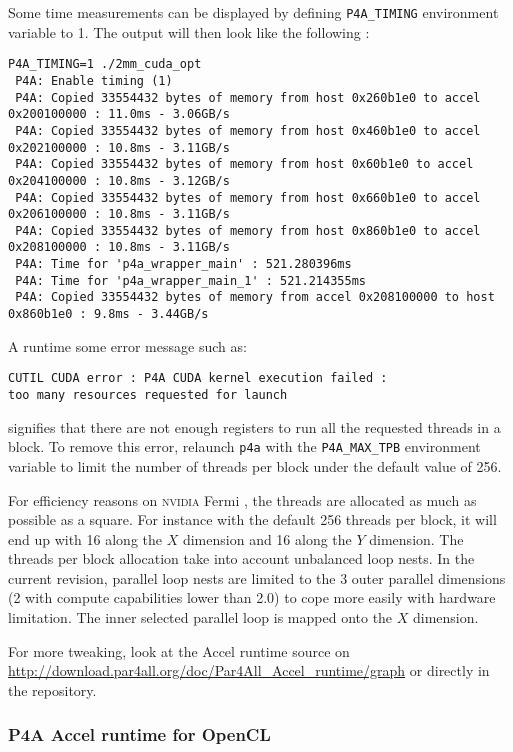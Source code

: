 \documentclass[a4paper]{article}
\begin{document}
Some time measurements can be displayed by defining
\verb|P4A_TIMING| environment variable to 1. The output will then look like the
following : {\scriptsize
\begin{verbatim}
P4A_TIMING=1 ./2mm_cuda_opt
 P4A: Enable timing (1)
 P4A: Copied 33554432 bytes of memory from host 0x260b1e0 to accel 0x200100000 : 11.0ms - 3.06GB/s
 P4A: Copied 33554432 bytes of memory from host 0x460b1e0 to accel 0x202100000 : 10.8ms - 3.11GB/s
 P4A: Copied 33554432 bytes of memory from host 0x60b1e0 to accel 0x204100000 : 10.8ms - 3.12GB/s
 P4A: Copied 33554432 bytes of memory from host 0x660b1e0 to accel 0x206100000 : 10.8ms - 3.11GB/s
 P4A: Copied 33554432 bytes of memory from host 0x860b1e0 to accel 0x208100000 : 10.8ms - 3.11GB/s
 P4A: Time for 'p4a_wrapper_main' : 521.280396ms
 P4A: Time for 'p4a_wrapper_main_1' : 521.214355ms
 P4A: Copied 33554432 bytes of memory from accel 0x208100000 to host 0x860b1e0 : 9.8ms - 3.44GB/s
\end{verbatim}
}


A runtime some error message such as:
\begin{verbatim}
CUTIL CUDA error : P4A CUDA kernel execution failed :
too many resources requested for launch
\end{verbatim}
signifies that there are not enough registers to run all the requested
threads in a block. To remove this error,
relaunch \texttt{p4a} with the \verb|P4A_MAX_TPB| environment variable to limit the
number of threads per block under the default value of 256.

For efficiency reasons on \textsc{nvidia} Fermi \Agpu, the threads are
allocated as much as possible as a square. For instance with the default 256 
threads per block, it will end up with 16 along the $X$ dimension and 16 along
the $Y$ dimension. The threads per block allocation take into account unbalanced 
loop nests. In the current revision, parallel loop nests are limited to the 3 
outer parallel dimensions (2 with compute capabilities lower than 2.0) to cope 
more easily with \Acuda \Agpu hardware limitation. The inner selected parallel 
loop is mapped onto the $X$ \Agpu dimension.

For more tweaking, look at the \Apfa Accel runtime source on
\url{http://download.par4all.org/doc/Par4All_Accel_runtime/graph} or
directly in the \Agit repository.

\subsubsection{P4A Accel runtime for OpenCL}
\label{sec:p4a-accel-runtime_opencl}
\end{document}
